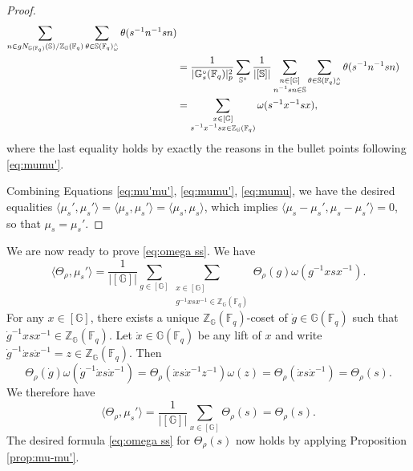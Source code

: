 \documentclass{amsart}
\newcommand{\F}{\mathbb{F}}
\newcommand{\FF}{\mathbb{F}}
\newcommand{\bbS}{\mathbb{S}}
\newcommand{\bbG}{\mathbb{G}}
\newcommand{\bbZ}{\mathbb{Z}}
\theoremstyle{plain}
\theoremstyle{definition}
\theoremstyle{remark}
\theoremstyle{theorem}
\begin{document}
\begin{proof}
\begin{align}
\sum_{n\in gN_{\bbG(\F_{q})}(\bbS)/\bbZ_{\bbG}(\F_{q})}
\sum_{\theta\in\bbS(\FF_q)^\wedge_\omega} \theta(s^{-1}n^{-1}sn)\\
\nonumber
&=\frac{1}{|\bbG_s^\circ(\FF_q)|_p^2}
\sum_{\bbS^{\circ}} \frac{1}{|[\bbS]|}
\sum_{\begin{subarray}{c} n\in [\bbG] \\ n^{-1}sn\in \bbS\end{subarray}}
\sum_{\theta\in\bbS(\FF_q)^\wedge_\omega} \theta(s^{-1}n^{-1}sn)\\
\label{eq:mumu}
&=  \sum_{\substack{x \in [\bbG] \\ s^{-1} x^{-1} s x \in \bbZ_{\bbG}(\FF_q)}} \omega(s^{-1} x^{-1} s x),
\end{align}
where the last equality holds by exactly the reasons in the bullet points following \eqref{eq:mumu'}.    

Combining Equations \eqref{eq:mu'mu'}, \eqref{eq:mumu'}, \eqref{eq:mumu}, we have the desired equalities $\langle \mu_s', \mu_s' \rangle = \langle \mu_s, \mu_s' \rangle = \langle \mu_s, \mu_s \rangle$, which implies $\langle \mu_s - \mu_s', \mu_s - \mu_s' \rangle = 0$, so that $\mu_s = \mu_s'$.
\end{proof}

We are now ready to prove \eqref{eq:omega ss}. We have
    \begin{equation*}
        \langle \Theta_\rho, \mu_s' \rangle = \frac{1}{|[\bbG]|} \sum_{g \in [\bbG]} \sum_{\substack{x \in [\bbG] \\ g^{-1} xsx^{-1} \in \bbZ_{\bbG}(\FF_q)}} \Theta_\rho(g) \omega(g^{-1} xsx^{-1}).
    \end{equation*}
    For any $x\in[\bbG]$, there exists a unique $\bbZ_{\bbG}(\FF_q)$-coset of $\dot g \in \bbG(\FF_q)$ such that $\dot g^{-1} x s x^{-1} \in \bbZ_{\bbG}(\FF_q)$.
    Let $\dot x \in \bbG(\FF_q)$ be any lift of $x$ and write $\dot g^{-1} \dot xs \dot x^{-1} = z \in \bbZ_{\bbG}(\FF_q)$. Then 
    \begin{equation*}
    \Theta_\rho(\dot g) \omega(\dot g^{-1} \dot xs \dot x^{-1}) = \Theta_\rho(\dot xs\dot x^{-1} z^{-1}) \omega(z) = \Theta_\rho(\dot xs \dot x^{-1}) = \Theta_\rho(s).
    \end{equation*}
    We therefore have
    \begin{equation*}
        \langle \Theta_\rho, \mu_s' \rangle = \frac{1}{|[\bbG]|} \sum_{x \in [\bbG]} \Theta_\rho(s) = \Theta_\rho(s).
    \end{equation*}
    The desired formula \eqref{eq:omega ss} for $\Theta_\rho(s)$ now holds by applying Proposition \ref{prop:mu-mu'}.
\end{document}
